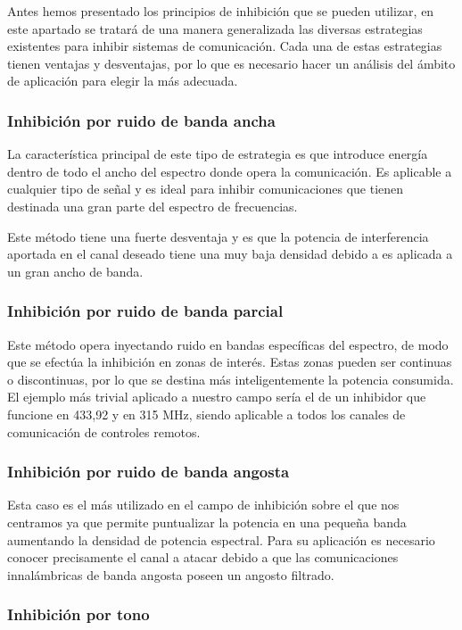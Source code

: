 \documentclass[12pt]{report}
\begin{document}
Antes hemos presentado los principios de inhibición que se pueden utilizar, en este apartado se tratará de una manera generalizada las diversas 
estrategias existentes para inhibir sistemas de comunicación. Cada una de estas estrategias tienen ventajas y desventajas, por lo que es necesario
hacer un análisis del ámbito de aplicación para elegir la más adecuada.


\subsubsection{Inhibición por ruido de banda ancha}

La característica principal de este tipo de estrategia es que introduce energía dentro de todo el ancho del espectro donde opera la comunicación.
Es aplicable a cualquier tipo de señal y es ideal para inhibir comunicaciones que tienen destinada una gran parte del espectro de frecuencias.\par
Este método tiene una fuerte desventaja y es que la potencia de interferencia aportada en el canal deseado tiene una muy baja densidad debido 
a es aplicada a un gran ancho de banda.

\subsubsection{Inhibición por ruido de banda parcial}

Este método opera inyectando ruido en bandas específicas del espectro, de modo que se efectúa la  inhibición en zonas de interés. Estas zonas 
pueden ser continuas o discontinuas, por lo que se destina más inteligentemente la potencia consumida. El ejemplo más trivial aplicado a nuestro
campo sería el de un inhibidor que funcione en 433,92 y en 315 MHz, siendo  aplicable a todos los canales de comunicación de controles remotos.

\subsubsection{Inhibición por ruido de banda angosta}

Esta caso es el más utilizado en el campo de inhibición sobre el que nos centramos ya que permite puntualizar la potencia en una pequeña
banda aumentando la densidad de potencia espectral. Para su aplicación es necesario conocer precisamente el canal a atacar debido a que las 
comunicaciones innalámbricas de banda angosta poseen un angosto filtrado.

\subsubsection{Inhibición por tono}
\end{document}
